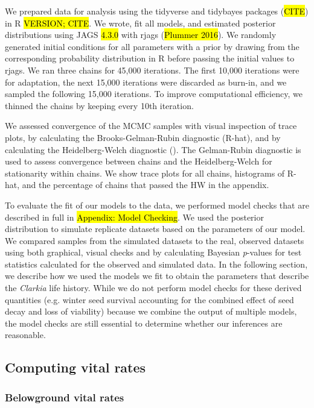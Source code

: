 \documentclass[12pt, oneside, titlepage]{article}   	%
\begin{document}
{We prepared data for analysis using the tidyverse and tidybayes packages (\hl{CITE}) in R \hl{VERSION; CITE}. We wrote, fit all models, and estimated posterior distributions using JAGS \hl{4.3.0} with rjags (\hl{Plummer 2016}). We randomly generated initial conditions for all parameters with a prior by drawing from the corresponding probability distribution in R before passing the initial values to rjags. We ran three chains for 45,000 iterations. The first 10,000 iterations were for adaptation, the next 15,000 iterations were discarded as burn-in, and we sampled the following 15,000 iterations. To improve computational efficiency, we thinned the chains by keeping every 10th iteration.

We assessed convergence of the MCMC samples with visual inspection of trace plots, by calculating the Brooks-Gelman-Rubin diagnostic (R-hat), and by calculating the Heidelberg-Welch diagnostic (\cite{elderd2015}). The Gelman-Rubin diagnostic is used to assess convergence between chains and the Heidelberg-Welch for stationarity within chains. We show trace plots for all chains, histograms of R-hat, and the percentage of chains that passed the HW in the appendix. 
 
To evaluate the fit of our models to the data, we performed model checks that are described in full in \hl{Appendix: Model Checking}. We used the posterior distribution to simulate replicate datasets based on the parameters of our model. We compared samples from the simulated datasets to the real, observed datasets using both graphical, visual checks and by calculating Bayesian \textit{p}-values for test statistics calculated for the observed and simulated data. In the following section, we describe how we used the models we fit to obtain the parameters that describe the \textit{Clarkia} life history. While we do not perform model checks for these derived quantities (e.g. winter seed survival accounting for the combined effect of seed decay and loss of viability) because we combine the output of multiple models, the model checks are still essential to determine whether our inferences are reasonable.

\subsection{Computing vital rates}

\subsubsection{Belowground vital rates}

}
\end{document}
